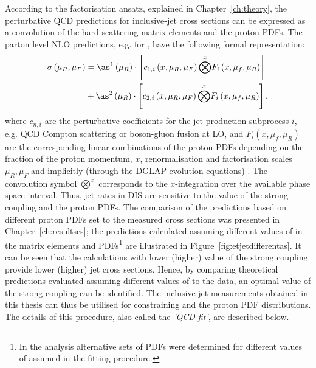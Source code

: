 According to the factorisation ansatz, explained in Chapter~\ref{ch:theory}, the perturbative QCD predictions for inclusive-jet cross sections can be expressed as a convolution of the hard-scattering matrix elements and the proton PDFs. The parton level NLO predictions, e.g. for \dsdetjetb, have the following formal representation:
\begin{equation}
	\begin{split}
\sigma\left( \mu_R, \mu_F\right)  &= \as^1\left( \mu_R\right) \cdot \left[ c_{1,i}\left( x, \mu_R, \mu_F\right) \overset{x}{\bigotimes } F_i\left( x, \mu_f, \mu_R \right) \right] \\
&+ \as^2\left( \mu_R\right) \cdot \left[ c_{2,i}\left( x, \mu_R, \mu_F\right) \overset{x}{\bigotimes } F_i\left( x, \mu_f, \mu_R \right) \right],
	\end{split}
	\label{eq:fitnloqcdpredictions}
\end{equation}
where $c_{n,i}$ are the perturbative coefficients for the jet-production subprocess $i$, e.g. QCD Compton scattering or boson-gluon fusion at LO, and $F_i\left( x, \mu_f, \mu_R \right)$ are the corresponding linear combinations of the proton PDFs depending on the fraction of the proton momentum, $x$, renormalisation and factorisation scales $\mu_R, \mu_F$ and implicitly (through the DGLAP evolution equations) \as. The convolution symbol $\overset{x}{\bigotimes}$ corresponds to the $x$-integration over the available phase space interval. Thus, jet rates in DIS are sensitive to the value of the strong coupling and the proton PDFs. The comparison of the predictions based on different proton PDFs set to the measured cross sections was presented in Chapter~\ref{ch:resultscs}; the predictions calculated assuming different values of \asz in the matrix elements and PDFs\footnote{In the  analysis alternative sets of PDFs were determined for different values of \asz assumed in the fitting procedure.} are illustrated in Figure~\ref{fig:etjetdifferentas}. It can be seen that the calculations with lower (higher) value of the strong coupling provide lower (higher) jet cross sections. Hence, by comparing theoretical predictions evaluated assuming different values of \asz to the data, an optimal value of the strong coupling can be identified. The inclusive-jet measurements obtained in this thesis can thus be utilised for constraining \as and the proton PDF distributions. The details of this procedure, also called the \emph{'QCD fit'}, are described below.



